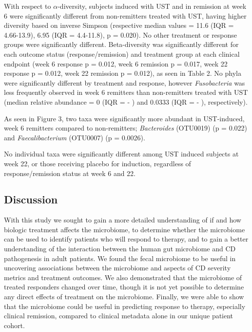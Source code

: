 \documentclass[11pt,]{article}
\begin{document}
With respect to \({\alpha}\)-diversity, subjects induced with UST and in
remission at week 6 were significantly different from non-remitters
treated with UST, having higher diversity based on inverse Simpson
(respective median values = 11.6 (IQR = 4.66-13.9), 6.95 (IQR =
4.4-11.8), p = 0.020). No other treatment or response groups were
significantly different. Beta-diversity was significantly different for
each outcome status (response/remission) and treatment group at each
clinical endpoint (week 6 response p = 0.012, week 6 remission p =
0.017, week 22 response p = 0.012, week 22 remission p = 0.012), as seen
in Table 2. No phyla were significantly different by treatment and
response, however \emph{Fusobacteria} was less frequently observed in
week 6 remitters than non-remitters treated with UST (median relative
abundance = 0 (IQR = - ) and 0.0333 (IQR = - ), respectively).

As seen in Figure 3, two taxa were significantly more abundant in
UST-induced, week 6 remitters compared to non-remitters;
\emph{Bacteroides} (OTU0019) (p = 0.022) and \emph{Faecalibacterium}
(OTU0007) (p = 0.0026).

No individual taxa were significantly different among UST induced
subjects at week 22, or those receiving placebo for induction,
regardless of response/remission status at week 6 and 22.

\subsection{Discussion}\label{discussion}

With this study we sought to gain a more detailed understanding of if
and how biologic treatment affects the microbiome, to determine whether
the microbiome can be used to identify patients who will respond to
therapy, and to gain a better understanding of the interaction between
the human gut microbiome and CD pathogenesis in adult patients. We found
the fecal microbiome to be useful in uncovering associations between the
microbiome and aspects of CD severity metrics and treatment outcomes. We
also demonstrated that the microbiome of treated responders changed over
time, though it is not yet possible to determine any direct effects of
treatment on the microbiome. Finally, we were able to show that the
microbiome could be useful in predicting response to therapy, especially
clinical remission, compared to clinical metadata alone in our unique
patient cohort.
\end{document}
